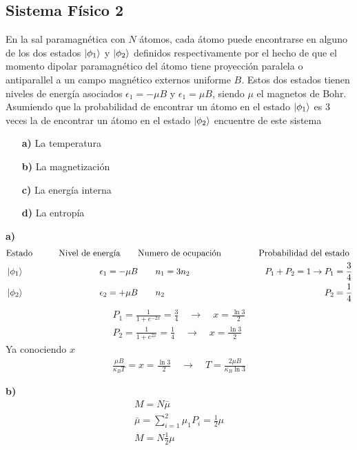 \documentclass{article}
\begin{document}
\subsection{Sistema Físico 2 }
En la sal paramagnética con $ N  $ átomos, cada átomo puede encontrarse en alguno de los dos estados $ \ket{\phi_1 } $ y $ \ket{\phi_2 } $ definidos respectivamente por el hecho de que el momento dipolar paramagnético del átomo tiene proyección paralela o antiparallel a un campo magnético externos uniforme $ B  $. Estos dos estados tienen niveles de energía asociados $ \epsilon_1 = - \mu B  $ y $ \epsilon_1 = \mu B  $, siendo $ \mu  $ el magnetos de Bohr. Asumiendo que la probabilidad de encontrar un átomo en el estado $ \ket{\phi_1}  $ es 3 veces la de encontrar un átomo en el estado $ \ket{\phi_2} $ encuentre de este sistema 
\begin{itemize}
  \item[\textbf{a) }] La temperatura 
  \item[\textbf{b) }] La magnetización 
  \item[\textbf{c) }] La energía interna 
  \item[\textbf{d) }] La entropía 
\end{itemize}
\textbf{a) }
\begin{align*}
  &\text{Estado} \qquad &\text{Nivel de energía}  \qquad &\text{Numero de ocupación} \qquad &\text{Probabilidad del estado } \\
  &\ket{\phi_1 } &\qquad\epsilon_1 = -\mu B &\qquad n_1 = 3 n_2 &\qquad P_1 + P_2 = 1 \rightarrow P_1 = \frac{3 }{4 } \\
  &\ket{\phi_2 } &\qquad\epsilon_2 = +\mu B  &\qquad n_2  &\qquad P_2 = \frac{1 }{4 }\\
\end{align*}
\begin{gather*}
  P_1 = \frac{1}{1 + e ^ {-2x }} = \frac{3 }{4 }  \quad \rightarrow \quad x = \frac{\ln 3 }{2 } 
  \\
  P_2 = \frac{1}{1 + e ^ {2x }} = \frac{1 }{4 }  \quad \rightarrow \quad x = \frac{\ln 3 }{2 } 
\end{gather*}
Ya conociendo $ x  $ 
\begin{gather*}
  \frac{\mu B }{\kappa_B T } = x = \frac{\ln 3 }{2 } \quad \rightarrow \quad T = \frac{2\mu B }{\kappa_B \ln 3 } 
\end{gather*}

\hfill 

\hfill 

\textbf{b) } 
\begin{gather*}
  M = N \bar \mu \\
  \bar \mu = \displaystyle\sum_{ i = 1 }^{2 } \mu_1 P_i = \frac{1}{2}\mu \\
  M = N \frac{1}{2}\mu 
\end{gather*}
\end{document}
